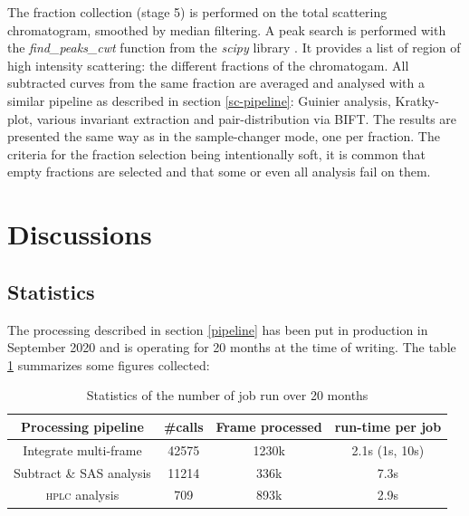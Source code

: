\documentclass[preprint]{iucr}              %
\begin{document}
The fraction collection (stage 5) is performed on the total scattering chromatogram, smoothed by median filtering. 
A peak search is performed with the \textit{find\_peaks\_cwt} function from the \textit{scipy} library \cite{scipy}.
It provides a list of region of high intensity scattering: the different fractions of the chromatogam.
All subtracted curves from the same fraction are averaged and analysed with a similar pipeline as described in section \ref{sc-pipeline}: Guinier analysis, Kratky-plot, various invariant extraction and pair-distribution via BIFT.
The results are presented the same way as in the sample-changer mode, one per fraction.
The criteria for the fraction selection being intentionally soft, it is common that empty fractions are selected and that some or even all analysis fail on them. 

\section{Discussions}

\subsection{Statistics}
The processing described in section \ref{pipeline} has been put in production in September 2020 and is operating for 20 months at the time of writing.
The table \ref{stats} summarizes some figures collected:
\begin{table}
    \begin{tabular}{|c|c|c|c|}
        \hline
        Processing pipeline & \#calls & Frame processed & run-time per job \\
        \hline
        Integrate multi-frame & 42575 & 1230k & 2.1s (1s, 10s) \\
        Subtract \& SAS analysis & 11214 & 336k & 7.3s \\
        \textsc{hplc} analysis & 709 & 893k & 2.9s \\
        \hline
    \end{tabular}
    \\
    \caption{Statistics of the number of job run over 20 months}
    \label{stats}
\end{table}
\end{document}
